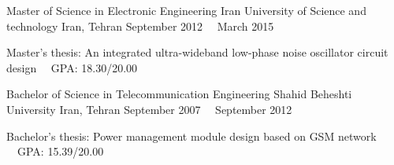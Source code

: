 


\begin{cventries}
  \cventry
    {Master of Science in Electronic Engineering} %
    {Iran University of Science and technology} %
    {Iran, Tehran} %
    {September 2012 ~\textemdash~March 2015} %
    {
      \begin{cvitems} %
        \item {Master's thesis: An integrated ultra-wideband low-phase noise oscillator circuit design ~\textendash~GPA: 18.30/20.00}
      \end{cvitems}
    }
  \cventry
    {Bachelor of Science in Telecommunication Engineering} %
    {Shahid Beheshti University } %
    {Iran, Tehran} %
    {September 2007 ~\textemdash~September 2012} %
    {
      \begin{cvitems} %
        \item {Bachelor's thesis: Power management module design based on GSM network ~\textendash~GPA: 15.39/20.00}
      \end{cvitems}
    }
\end{cventries}
